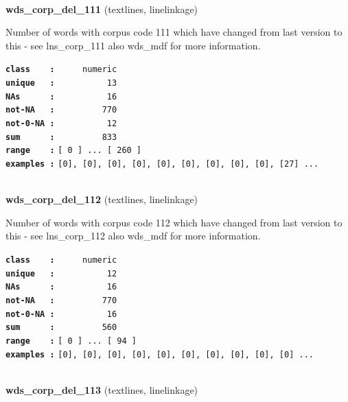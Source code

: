 \documentclass[]{article}
\begin{document}
~

\textbf{wds\_corp\_del\_111} (textlines, linelinkage)

Number of words with corpus code 111 which have changed from last
version to this - see lns\_corp\_111 also wds\_mdf for more information.

\textbf{\texttt{class\ \ \ \ :}} \texttt{~~~~~numeric}\\
\textbf{\texttt{unique\ \ \ :}} \texttt{~~~~~~~~~~13}\\
\textbf{\texttt{NAs\ \ \ \ \ \ :}} \texttt{~~~~~~~~~~16}\\
\textbf{\texttt{not-NA\ \ \ :}} \texttt{~~~~~~~~~770}\\
\textbf{\texttt{not-0-NA\ :}} \texttt{~~~~~~~~~~12}\\
\textbf{\texttt{sum\ \ \ \ \ \ :}} \texttt{~~~~~~~~~833}\\
\textbf{\texttt{range\ \ \ \ :}}
\texttt{{[}\ 0\ {]}\ ...\ {[}\ 260\ {]}}\\
\textbf{\texttt{examples\ :}}
\texttt{{[}0{]},\ {[}0{]},\ {[}0{]},\ {[}0{]},\ {[}0{]},\ {[}0{]},\ {[}0{]},\ {[}0{]},\ {[}0{]},\ {[}27{]}\ ...}\\

~

\textbf{wds\_corp\_del\_112} (textlines, linelinkage)

Number of words with corpus code 112 which have changed from last
version to this - see lns\_corp\_112 also wds\_mdf for more information.

\textbf{\texttt{class\ \ \ \ :}} \texttt{~~~~~numeric}\\
\textbf{\texttt{unique\ \ \ :}} \texttt{~~~~~~~~~~12}\\
\textbf{\texttt{NAs\ \ \ \ \ \ :}} \texttt{~~~~~~~~~~16}\\
\textbf{\texttt{not-NA\ \ \ :}} \texttt{~~~~~~~~~770}\\
\textbf{\texttt{not-0-NA\ :}} \texttt{~~~~~~~~~~16}\\
\textbf{\texttt{sum\ \ \ \ \ \ :}} \texttt{~~~~~~~~~560}\\
\textbf{\texttt{range\ \ \ \ :}}
\texttt{{[}\ 0\ {]}\ ...\ {[}\ 94\ {]}}\\
\textbf{\texttt{examples\ :}}
\texttt{{[}0{]},\ {[}0{]},\ {[}0{]},\ {[}0{]},\ {[}0{]},\ {[}0{]},\ {[}0{]},\ {[}0{]},\ {[}0{]},\ {[}0{]}\ ...}\\

~

\textbf{wds\_corp\_del\_113} (textlines, linelinkage)
\end{document}

